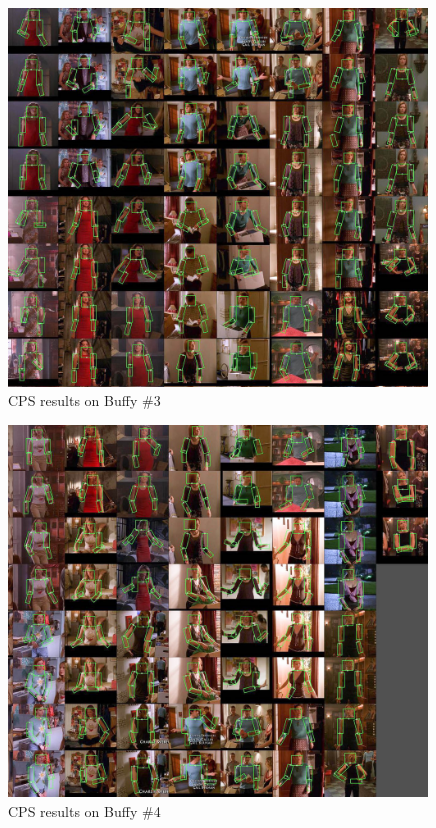 \begin{figure}[tb]
\begin{center}
\includegraphics[width=0.99\textwidth]{figs/buffy_test_tiled_cps-4.jpg}
\caption[CPS results on Buffy \#3]{CPS results on Buffy \#3}
\label{fig:buffy-cps3}
\end{center}
\end{figure}\begin{figure}[tb]
\begin{center}
\includegraphics[width=0.99\textwidth]{figs/buffy_test_tiled_cps-3.jpg}
\caption[CPS results on Buffy \#4]{CPS results on Buffy \#4}
\label{fig:buffy-cps4}
\end{center}
\end{figure}

